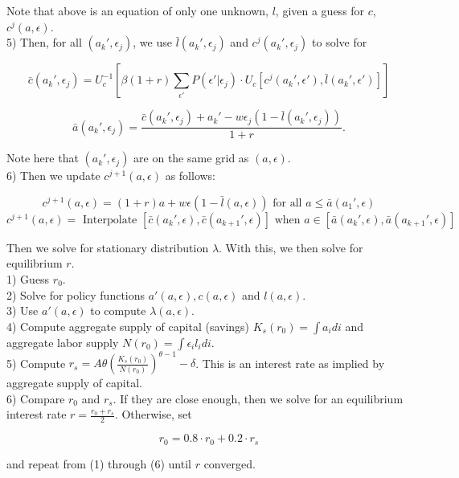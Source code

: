 \documentclass{article}
\begin{document}
		Note that above is an equation of only one unknown, $l$, given a guess for $c$, $c^{j}(a,\epsilon)$. \\
		
		
		5) Then, for all $(a_{k}',\epsilon_{j})$, we use $\bar{l}(a_{k}',\epsilon_{j})$ and $c^{j}(a_{k}',\epsilon_{j})$ to solve for 
		
		$$\bar{c}(a_{k}', \epsilon_{j}) = U_{c}^{-1}\left[ \beta (1+r) \sum_{\epsilon'}P(\epsilon'|\epsilon_{j}) \cdot U_{c}\left[ c^{j}(a_{k}',\epsilon'),\bar{l}(a_{k}',\epsilon') \right] \right]$$
		
		$$\bar{a}(a_{k}', \epsilon_{j}) = \frac{\bar{c}(a_{k}', \epsilon_{j}) + a_{k}' - w\epsilon_{j}(1-\bar{l}(a_{k}',\epsilon_{j}))}{1+r}.$$
		
		Note here that $(a_{k}', \epsilon_{j})$ are on the same grid as $(a,\epsilon)$. \\
		
		6) Then we update $c^{j+1}(a,\epsilon)$ as follows:
		
		$$c^{j+1}(a,\epsilon) = (1+r)a + w \epsilon (1- \bar{l}(a,\epsilon)) \text{ for all } a \leq \bar{a}(a_{1}', \epsilon)$$
		$$c^{j+1}(a,\epsilon) = \text{ Interpolate } [\bar{c}(a_{k}', \epsilon), \bar{c}(a_{k+1}', \epsilon)] \text{ when } a \in [\bar{a}(a_{k}', \epsilon), \bar{a}(a_{k+1}', \epsilon)]$$
		
		Then we solve for stationary distribution $\lambda$. With this, we then solve for equilibrium $r$. \\
		
		1) Guess $r_{0}$. \\
		
		2) Solve for policy functions $a'(a,\epsilon),c(a,\epsilon)$ and $l(a,\epsilon)$. \\
		
		3) Use $a'(a,\epsilon)$ to compute $\lambda(a,\epsilon)$. \\
		
		4) Compute aggregate supply of capital (savings) $K_{s}(r_{0}) = \int a_{i}di$ and aggregate labor supply $N(r_{0}) = \int \epsilon_{i}l_{i}di$. \\
		
		5) Compute $r_{s} = A\theta \left( \frac{K_{s}(r_{0})}{N(r_{0})} \right)^{\theta-1} -\delta$. This is an interest rate as implied by aggregate supply of capital. \\
		
		6) Compare $r_{0}$ and $r_{s}$. If they are close enough, then we solve for an equilibrium interest rate $r = \frac{r_{0}+r_{s}}{2}$. Otherwise, set 
		
		$$r_{0} = 0.8 \cdot r_{0} + 0.2 \cdot r_{s}$$
		
		and repeat from (1) through (6) until $r$ converged.
	
	
	
\end{document}
